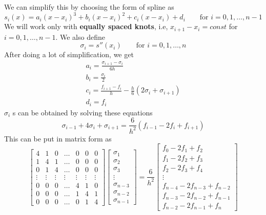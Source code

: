 \documentclass{article}
\begin{document}
	We can simplify this by choosing the form of spline as
	\[s_i(x) = a_i(x-x_i)^3 + b_i(x-x_i)^2 + c_i(x-x_i) +d_i \qquad \text{for }i=0,1,\hdots,n-1\]
	We will work only with \textbf{equally spaced knots}, i.e, $x_{i+1}-x_{i} = const$ for $i = 0, 1,\hdots,n-1$.
	We also define 
	\[\sigma_i = s''(x_i) \qquad \text{for }i=0,1,\hdots,n\]
	After doing a lot of simplification, we get 
	\begin{gather*}
		\boxed{a_i = \frac{\sigma_{i+1}-\sigma_i}{6h}}\\
		\boxed{b_i = \frac{\sigma_i}{2}}\\
		\boxed{c_i = \frac{f_{i+1}-f_i}{h} - \frac{h}{6}(2\sigma_i+\sigma_{i+1})}\\
		\boxed{d_i = f_i}
	\end{gather*}
	$\sigma_i$ s can be obtained by solving these equations
	\[\boxed{\sigma_{i-1} + 4 \sigma_i + \sigma_{i+1} = \frac{6}{h^2}(f_{i-1} - 2f_i + f_{i+1} )}\]
	This can be put in matrix form as
	\begin{equation*}
	\begin{bmatrix}
	4 &1 &0 &\hdots &0 &0 &0\\
	1 &4 &1 &\hdots &0 &0 &0\\
	0 &1 &4 &\hdots &0 &0 &0\\
	\vdots &\vdots &\vdots &\vdots &\vdots &\vdots &\vdots\\
	0 &0 &0 &\hdots &4 &1 &0\\
	0 &0 &0 &\hdots &1 &4 &1\\
	0 &0 &0 &\hdots &0 &1 &4
	\end{bmatrix} 
	\begin{bmatrix}
	\sigma_1\\
	\sigma_2\\
	\sigma_3\\
	\vdots\\
	\sigma_{n-3}\\
	\sigma_{n-2}\\
	\sigma_{n-1}
	\end{bmatrix}
	= \frac{6}{h^2}
	\begin{bmatrix}
	f_0 - 2f_1 +f_2\\
	f_1 -2f_2 +f_3\\
	f_2 -2f_3 +f_4\\
	\vdots\\
	f_{n-4} -2f_{n-3} +f_{n-2}\\
	f_{n-3} -2f_{n-2} +f_{n-1}\\
	f_{n-2} -2f_{n-1} +f_{n}
	\end{bmatrix}
	\end{equation*}
\end{document}
